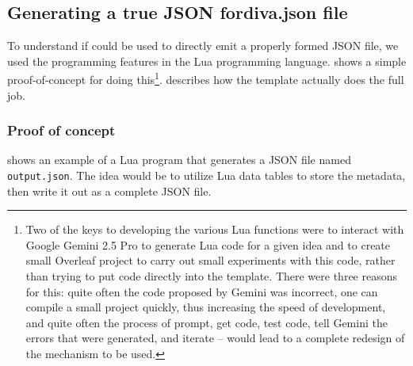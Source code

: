 \documentclass[12pt, twoside]{article}
\begin{document}
\subsection{Generating a true JSON fordiva.json file}
\label{sec:avoidCleanup}

To understand if \LuaLaTeX{} could be used to directly emit a properly formed \gls{JSON} file, we used the programming features in the Lua programming language.  shows a simple proof-of-concept for doing this\footnote{Two of the keys to developing the various Lua functions were \first to interact with Google Gemini 2.5 Pro to generate Lua code for a given idea and \Second to create small Overleaf project to carry out small experiments with this code, rather than trying to put code directly into the template. There were three reasons for this: \first quite often the code proposed by Gemini was incorrect, \Second one can compile a small project quickly, thus increasing the speed of development, and \third quite often the process of prompt, get code, test code, tell Gemini the errors that were generated, and iterate -- would lead to a complete redesign of the mechanism to be used.}.  describes how the template actually does the full job.

\subsubsection{Proof of concept}
\label{sec:LuaProofOfConcept}
 shows an example of a Lua program that generates a JSON file named \texttt{output.json}. The idea would be to utilize Lua data tables to store the metadata, then write it out as a complete JSON file.
\end{document}
